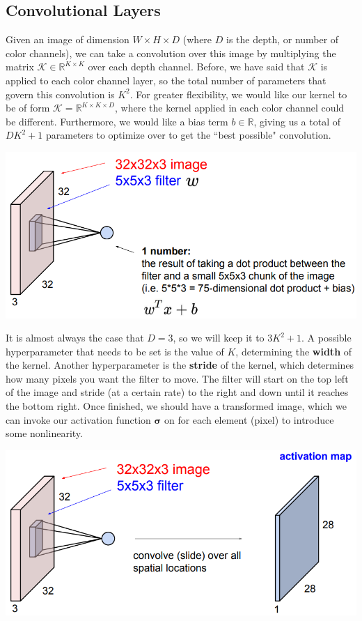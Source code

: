 \documentclass{article}
\theoremstyle{definition}
\theoremstyle{remark}
\theoremstyle{definition}
\begin{document}
\subsection{Convolutional Layers}

Given an image of dimension $W \times H \times D$ (where $D$ is the depth, or number of color channels), we can take a convolution over this image by multiplying the matrix $\mathcal{K} \in \mathbb{R}^{K \times K}$ over each depth channel. Before, we have said that $\mathcal{K}$ is applied to each color channel layer, so the total number of parameters that govern this convolution is $K^2$. For greater flexibility, we would like our kernel to be of form $\mathcal{K} = \mathbb{R}^{K \times K \times D}$, where the kernel applied in each color channel could be different. Furthermore, we would like a bias term $b \in \mathbb{R}$, giving us a total of $DK^2 + 1$ parameters to optimize over to get the ``best possible" convolution. 
\begin{center}
    \includegraphics[scale=0.3]{Images/CNNs/kernel1.png}
\end{center}
It is almost always the case that $D = 3$, so we will keep it to $3K^2 + 1$. A possible hyperparameter that needs to be set is the value of $K$, determining the \textbf{width} of the kernel. Another hyperparameter is the \textbf{stride} of the kernel, which determines how many pixels you want the filter to move. The filter will start on the top left of the image and stride (at a certain rate) to the right and down until it reaches the bottom right. Once finished, we should have a transformed image, which we can invoke our activation function $\boldsymbol{\sigma}$ on for each element (pixel) to introduce some nonlinearity. 
\begin{center}
    \includegraphics[scale=0.3]{Images/CNNs/kernel2.png}
\end{center}
\end{document}
